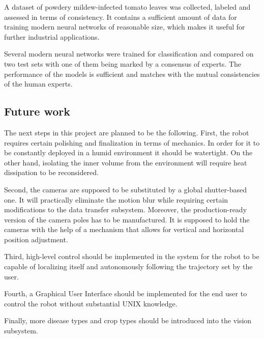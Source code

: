 \begin{description}
A dataset of powdery mildew-infected tomato leaves was collected, labeled and assessed in terms of consistency. It contains a sufficient amount of data for training modern neural networks of reasonable size, which makes it useful for further industrial applications.

Several modern neural networks were trained for classification and compared on two test sets with one of them being marked by a consensus of experts.
The performance of the models is sufficient and matches with the mutual consistencies of the human experts.


\subsection{Future work}

The next steps in this project are planned to be the following.
First, the robot requires certain polishing and finalization in terms of mechanics.
In order for it to be constantly deployed in a humid environment it should be watertight.
On the other hand, isolating the inner volume from the environment will require heat dissipation to be reconsidered.

Second, the cameras are supposed to be substituted by a global shutter-based one.
It will practically eliminate the motion blur while requiring certain modifications to the data transfer subsystem.
Moreover, the production-ready version of the camera poles has to be manufactured.
It is supposed to hold the cameras with the help of a mechanism that allows for vertical and horizontal position adjustment.

Third, high-level control should be implemented in the system for the robot to be capable of localizing itself and autonomously following the trajectory set by the user.

Fourth, a Graphical User Interface should be implemented for the end user to control the robot without substantial UNIX knowledge.

Finally, more disease types and crop types should be introduced into the vision subsystem.

\end{description}

